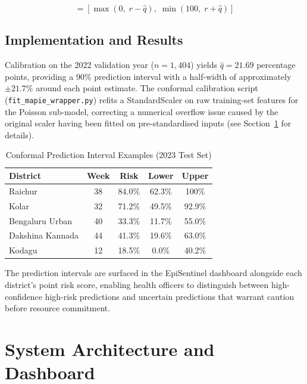 \documentclass[conference]{IEEEtran}
\begin{document}
\begin{equation}
  [r_{\text{lower}},\; r_{\text{upper}}]
  = \left[\max(0,\; r - \hat{q}),\; \min(100,\; r + \hat{q})\right]
  \label{eq:interval}
\end{equation}

\subsection{Implementation and Results}

Calibration on the 2022 validation year ($n=1{,}404$) yields
$\hat{q} = 21.69$ percentage points, providing a 90\% prediction
interval with a half-width of approximately $\pm 21.7\%$ around
each point estimate. The conformal calibration script
(\texttt{fit\_mapie\_wrapper.py}) refits a StandardScaler on raw
training-set features for the Poisson sub-model, correcting a
numerical overflow issue caused by the original scaler having been
fitted on pre-standardised inputs (see Section~\ref{sec:architecture}
for details).

\begin{table}[htbp]
  \caption{Conformal Prediction Interval Examples (2023 Test Set)}
  \label{tab:conformal}
  \centering
  \renewcommand{\arraystretch}{1.15}
  \setlength{\tabcolsep}{4pt}
  \begin{tabular}{lcccc}
    \toprule
    \textbf{District} & \textbf{Week} &
    \textbf{Risk} & \textbf{Lower} & \textbf{Upper} \\
    \midrule
    Raichur          & 38 & 84.0\% & 62.3\% & 100\%  \\
    Kolar            & 32 & 71.2\% & 49.5\% & 92.9\% \\
    Bengaluru Urban  & 40 & 33.3\% & 11.7\% & 55.0\% \\
    Dakshina Kannada & 44 & 41.3\% & 19.6\% & 63.0\% \\
    Kodagu           & 12 & 18.5\% & 0.0\%  & 40.2\% \\
    \bottomrule
  \end{tabular}
\end{table}

The prediction intervals are surfaced in the EpiSentinel dashboard
alongside each district's point risk score, enabling health
officers to distinguish between high-confidence high-risk predictions
and uncertain predictions that warrant caution before resource
commitment.

\section{System Architecture and Dashboard}
\label{sec:architecture}
\end{document}

